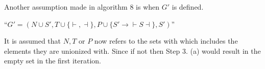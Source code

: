 Another assumption made in algorithm 8 is when $G'$ is defined.
\begin{center}
    ``$G' = (N \cup {S'}, T \cup \{\vdash, \dashv\}, P \cup \{S' \to \vdash S \dashv\}, S')$''
\end{center}
It is assumed that $N, T$ or $P$ now refers to the sets with which includes the elements they are unionized with. Since if not then Step 3. (a) would result in the empty set in the first iteration.